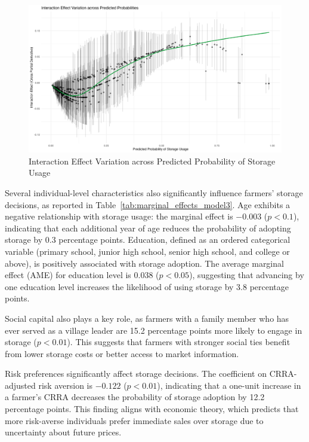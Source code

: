 \begin{figure}[ht]
\centering
\includegraphics[width=1\textwidth]{figures/Interaction_Effect_across_Predicted Probabilities.png}
\caption{Interaction Effect Variation across Predicted Probability of Storage Usage}
\label{Figure: interaction effects}
\end{figure}


Several individual-level characteristics also significantly influence farmers' storage decisions, as reported in Table~\ref{tab:marginal_effects_model3}. Age exhibits a negative relationship with storage usage: the marginal effect is \(-0.003\) (\(p<0.1\)), indicating that each additional year of age reduces the probability of adopting storage by 0.3 percentage points. Education, defined as an ordered categorical variable (primary school, junior high school, senior high school, and college or above), is positively associated with storage adoption. The average marginal effect (AME) for education level is 0.038 (\(p<0.05\)), suggesting that advancing by one education level increases the likelihood of using storage by 3.8 percentage points.


Social capital also plays a key role, as farmers with a family member who has ever served as a village leader are 15.2 percentage points more likely to engage in storage (\(p<0.01\)). This suggests that farmers with stronger social ties benefit from lower storage costs or better access to market information.

Risk preferences significantly affect storage decisions. The coefficient on CRRA-adjusted risk aversion is \(-0.122\) (\(p<0.01\)), indicating that a one-unit increase in a farmer's CRRA decreases the probability of storage adoption by 12.2 percentage points. This finding aligns with economic theory, which predicts that more risk-averse individuals prefer immediate sales over storage due to uncertainty about future prices.

